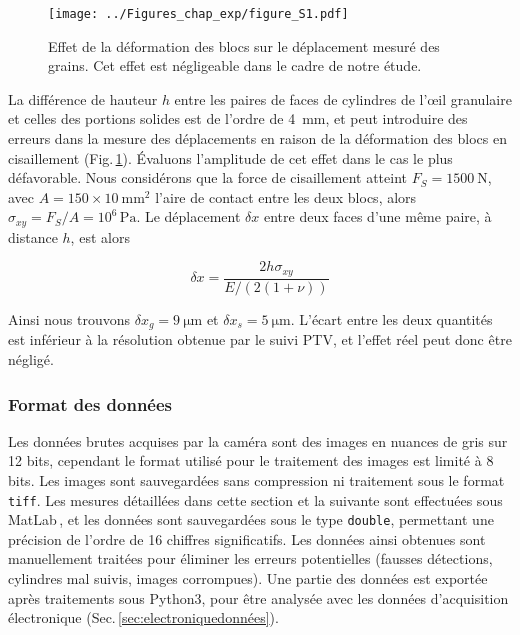 

\begin{figure}[htb]
\centering
\texttt{[image: ../Figures\_chap\_exp/figure\_S1.pdf]}
\caption[Effet de la déformation des blocs]{Effet de la déformation des blocs sur le déplacement mesuré des grains. Cet effet est négligeable dans le cadre de notre étude.}
\label{fig:defor}
\end{figure}

La différence de hauteur $h$ entre les paires de faces de cylindres de l'œil granulaire et celles des portions solides est de l'ordre de \SI{4}{\milli\meter}, et peut introduire des erreurs dans la mesure des déplacements en raison de la déformation des blocs en cisaillement (Fig.\,\ref{fig:defor}). Évaluons l'amplitude de cet effet dans le cas le plus défavorable. Nous considérons que la force de cisaillement atteint $F_S=\SI{1500}{\newton}$, avec $A=150\times\SI{10}{\milli\meter\squared}$ l'aire de contact entre les deux blocs, alors $\sigma_{xy}=F_S/A=10^6\,\text{Pa}$. Le déplacement $\delta x$ entre deux faces d'une même paire, à distance $h$, est alors

\begin{equation}
\delta x = \frac{2h\sigma_{xy}}{E/(2(1+\nu))}
\end{equation}

Ainsi nous trouvons $\delta x_g=\SI{9}{\micro\meter}$ et $\delta x_s=\SI{5}{\micro\meter}$. L'écart entre les deux quantités est inférieur à la résolution obtenue par le suivi PTV, et l'effet réel peut donc être négligé.






\subsubsection{Format des données}
\label{sec:optiquesdonnées}

Les données brutes acquises par la caméra sont des images en nuances de gris sur 12 bits, cependant le format utilisé pour le traitement des images est limité à 8 bits. Les images sont sauvegardées sans compression ni traitement sous le format \texttt{tiff}. Les mesures détaillées dans cette section et la suivante sont effectuées sous MatLab\,\cite{matlab_9501067069_2018}, et les données sont sauvegardées sous le type \texttt{double}, permettant une précision de l'ordre de 16 chiffres significatifs. Les données ainsi obtenues sont manuellement traitées pour éliminer les erreurs potentielles (fausses détections, cylindres mal suivis, images corrompues). Une partie des données est exportée après traitements sous Python3, pour être analysée avec les données d'acquisition électronique (Sec.\,\ref{sec:electroniquedonnées}).







